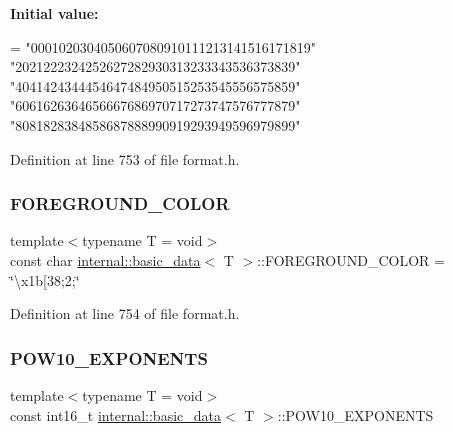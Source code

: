 {\bfseries Initial value\+:}
\begin{DoxyCode}
=
    \textcolor{stringliteral}{"0001020304050607080910111213141516171819"}
    \textcolor{stringliteral}{"2021222324252627282930313233343536373839"}
    \textcolor{stringliteral}{"4041424344454647484950515253545556575859"}
    \textcolor{stringliteral}{"6061626364656667686970717273747576777879"}
    \textcolor{stringliteral}{"8081828384858687888990919293949596979899"}
\end{DoxyCode}


Definition at line 753 of file format.\+h.

\mbox{\label{structinternal_1_1basic__data_a2f51626a6c71cb0c8b3a205be0b581c7}} 
\subsubsection{\texorpdfstring{F\+O\+R\+E\+G\+R\+O\+U\+N\+D\+\_\+\+C\+O\+L\+OR}{FOREGROUND\_COLOR}}
{\footnotesize\ttfamily template$<$typename T  = void$>$ \\
const char \hyperlink{structinternal_1_1basic__data}{internal\+::basic\+\_\+data}$<$ T $>$\+::F\+O\+R\+E\+G\+R\+O\+U\+N\+D\+\_\+\+C\+O\+L\+OR = \char`\"{}\textbackslash{}x1b\mbox{[}38;2;\char`\"{}\hspace{0.3cm}{\ttfamily [static]}}



Definition at line 754 of file format.\+h.

\mbox{\label{structinternal_1_1basic__data_a41e41eca0a0bed1580095339e82a8a13}} 
\subsubsection{\texorpdfstring{P\+O\+W10\+\_\+\+E\+X\+P\+O\+N\+E\+N\+TS}{POW10\_EXPONENTS}}
{\footnotesize\ttfamily template$<$typename T  = void$>$ \\
const int16\+\_\+t \hyperlink{structinternal_1_1basic__data}{internal\+::basic\+\_\+data}$<$ T $>$\+::P\+O\+W10\+\_\+\+E\+X\+P\+O\+N\+E\+N\+TS\hspace{0.3cm}{\ttfamily [static]}}

